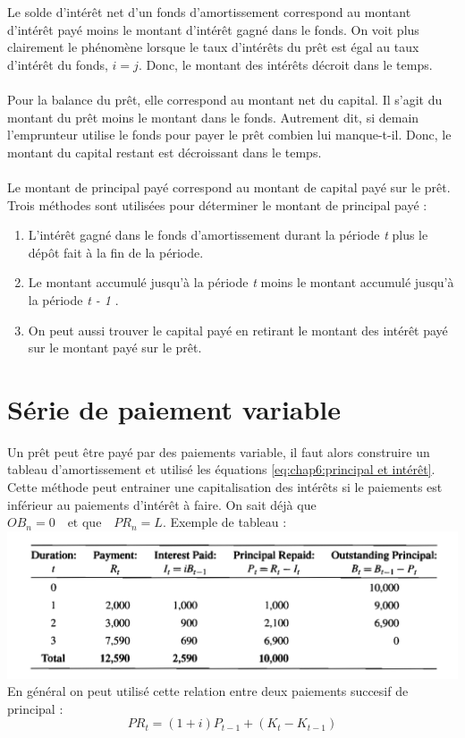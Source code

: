 \documentclass[11pt,french]{report}
\begin{document}
Le solde d'intérêt net d'un fonds d'amortissement correspond au montant d'intérêt payé moins le montant d'intérêt gagné dans le fonds. On voit plus clairement le phénomène lorsque le taux d'intérêts du prêt est égal au taux d'intérêt du fonds, $ i = j $. Donc, le montant des intérêts décroit dans le temps.
\\
\\
Pour la balance du prêt, elle correspond au montant net du capital. Il s'agit du montant du prêt moins le montant dans le fonds. Autrement dit, si demain l'emprunteur utilise le fonds pour payer le prêt combien lui manque-t-il. Donc, le montant du capital restant est décroissant dans le temps.
\\
\\
Le montant de principal payé correspond au montant de capital payé sur le prêt. Trois méthodes sont utilisées pour déterminer le montant de principal payé :
\begin{enumerate}
\item L'intérêt gagné dans le fonds d'amortissement durant la période \textit{t} plus le dépôt fait à la fin de la période.
\item Le montant accumulé jusqu'à la période \textit{t} moins le montant accumulé jusqu'à la période \textit{t - 1 }.
\item On peut aussi trouver le capital payé en retirant le montant des intérêt payé sur le montant payé sur le prêt.
\end{enumerate}

\section{Série de paiement variable}
\label{sec:sinking fund paiement variable}

Un prêt peut être payé par des paiements variable, il faut alors construire un tableau d'amortissement et utilisé les équations \ref{eq:chap6:principal et intérêt}. Cette méthode peut entrainer une capitalisation des intérêts si le paiements est inférieur au paiements d'intérêt à faire. On sait déjà que $OB_n = 0 \quad \text{et que} \quad PR_n = L $.  Exemple de tableau :
\\
\includegraphics[scale=0.45]{picture14.PNG}
\\
En général on peut utilisé cette relation entre deux paiements succesif de principal :
\begin{equation}
PR_t = (1 + i)P_{t-1} + (K_t - K_{t-1})
\end{equation}
\end{document}
